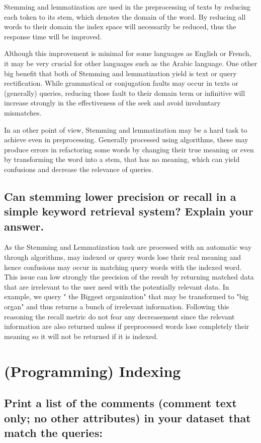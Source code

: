 \documentclass{scrartcl}
\begin{document}
Stemming and lemmatization are used in the preprocessing of texts by reducing each token to its stem, which denotes the domain of the word. By reducing all words to their domain the index space will necessarily be reduced, thus the response time will be improved.

Although this improvement is minimal for some languages as English or French, it may be very crucial for other languages such as the Arabic language. One other big benefit that both of Stemming and lemmatization yield is text or query rectification. While grammatical or conjugation faults may occur in texts or (generally) queries, reducing those fault to their domain term or infinitive will increase strongly in the effectiveness of the seek and avoid involuntary mismatches.

In an other point of view, Stemming and lemmatization may be a hard task to achieve even in preprocessing. Generally processed using algorithms, these may produce errors in refactoring some words by changing their true meaning or even by transforming the word into a stem, that has no meaning, which can yield confusions and decrease the relevance of queries.

\subsection{Can stemming lower precision or recall in a simple keyword retrieval system? Explain your answer.}

As the Stemming and Lemmatization task are processed with an automatic way through algorithms, may indexed or query words lose their real meaning and hence confusions may occur in matching query words with the indexed word. This issue can low strongly the precision of the result by returning matched data that are irrelevant to the user need with the potentially relevant data. In example, we query " the Biggest organization" that may be transformed to "big organ" and thus returns a bunch of irrelevant information. Following this reasoning the recall metric do not fear any decreasement since the relevant information are also returned unless if preprocessed words lose completely their meaning so it will not be returned if it is indexed.

\section{(Programming) Indexing}

\subsection{Print a list of the comments (comment text only; no other attributes) in your dataset that
match the queries: }
\end{document}
